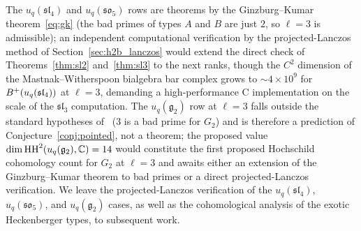 The $u_q(\mathfrak{sl}_4)$ and $u_q(\mathfrak{so}_5)$ rows are theorems by the Ginzburg--Kumar theorem~\eqref{eq:gk} (the bad primes of types $A$ and $B$ are just $2$, so $\ell = 3$ is admissible); an independent computational verification by the projected-Lanczos method of Section~\ref{sec:h2b_lanczos} would extend the direct check of Theorems~\ref{thm:sl2} and~\ref{thm:sl3} to the next ranks, though the $C^2$ dimension of the Mastnak--Witherspoon bialgebra bar complex grows to $\sim 4 \times 10^{9}$ for $B^{+}(u_q(\mathfrak{sl}_4))$ at $\ell = 3$, demanding a high-performance C implementation on the scale of the $\mathfrak{sl}_3$ computation. The $u_q(\mathfrak{g}_2)$ row at $\ell = 3$ falls outside the standard hypotheses of~\cite{GK93} ($3$ is a bad prime for $G_2$) and is therefore a prediction of Conjecture~\ref{conj:pointed}, not a theorem; the proposed value $\dim \operatorname{HH}^2(u_q(\mathfrak{g}_2), \mathbb{C}) = 14$ would constitute the first proposed Hochschild cohomology count for $G_2$ at $\ell = 3$ and awaits either an extension of the Ginzburg--Kumar theorem to bad primes or a direct projected-Lanczos verification. We leave the projected-Lanczos verification of the $u_q(\mathfrak{sl}_4)$, $u_q(\mathfrak{so}_5)$, and $u_q(\mathfrak{g}_2)$ cases, as well as the cohomological analysis of the exotic Heckenberger types, to subsequent work.
